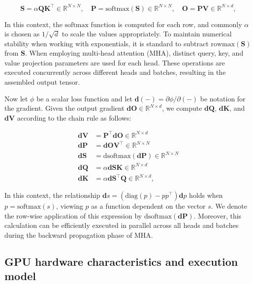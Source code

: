 \begin{equation*}
  \mathbf{S} = \alpha \mathbf{Q} \mathbf{K}^\top \in \mathbb{R}^{N \times N}, \quad \mathbf{P} = \mathrm{softmax}(\mathbf{S}) \in \mathbb{R}^{N \times N}, \quad \mathbf{O} = \mathbf{P}\mathbf{V} \in \mathbb{R}^{N \times d},
\end{equation*}

In this context, the $\mathrm{softmax}$ function is computed for each row, and commonly $\alpha$ is chosen as $1/\sqrt{d}$ to scale the values appropriately. To maintain numerical stability when working with exponentials, it is standard to subtract $\mathrm{rowmax}(\mathbf{S})$ from $\mathbf{S}$. When employing multi-head attention (MHA), distinct query, key, and value projection parameters are used for each head. These operations are executed concurrently across different heads and batches, resulting in the assembled output tensor.

Now let $\phi$ be a scalar loss function and let $\mathbf{d}(-) = \partial \phi / \partial (-)$ be notation for the gradient. Given the output gradient $\mathbf{dO} \in \mathbb{R}^{N \times d}$, we compute $\mathbf{dQ}$, $\mathbf{dK}$, and $\mathbf{dV}$ according to the chain rule as follows:

\begin{align*}
  \mathbf{dV} &= \mathbf{P}^\top \mathbf{dO} \in \mathbb{R}^{N \times d} \\
  \mathbf{dP} &= \mathbf{dO} \mathbf{V}^\top \in \mathbb{R}^{N \times N} \\
  \mathbf{dS} &= \mathrm{dsoftmax} (\mathbf{dP}) \in \mathbb{R}^{N \times N} \\
  \mathbf{dQ} &= \alpha \mathbf{dS} \mathbf{K} \in \mathbb{R}^{N \times d} \\
  \mathbf{dK} &= \alpha \mathbf{dS}^\top \mathbf{Q} \in \mathbb{R}^{N \times d},
\end{align*}

In this context, the relationship $\mathbf{d}s = (\mathrm{diag}(p) - p p^\top)\mathbf{d}p$ holds when $p = \mathrm{softmax}(s)$, viewing $p$ as a function dependent on the vector $s$. We denote the row-wise application of this expression by $\mathrm{dsoftmax}(\mathbf{dP})$. Moreover, this calculation can be efficiently executed in parallel across all heads and batches during the backward propagation phase of MHA.

\subsection{GPU hardware characteristics and execution model}
\label{subsec:hardware}

